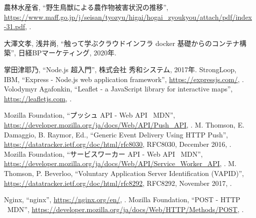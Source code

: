 \documentclass[12pt]{honka_v1}
\begin{document}
\fi
\begin{thebibliography}{99}
     農林水産省, ``野生鳥獣による農作物被害状況の推移'', \url{https://www.maff.go.jp/j/seisan/tyozyu/higai/hogai_zyoukyou/attach/pdf/index-31.pdf}, .
    
     大澤文孝, 浅井尚, ``触って学ぶクラウドインフラ docker 基礎からのコンテナ構築'', 日経BPマーケティング, 2020年.
    
     掌田津耶乃, ``Node.js 超入門'', 株式会社 秀和システム, 2017年.
     StrongLoop, IBM, ``Express - Node.js web application framework'', \url{https://expressjs.com/}, .
     Volodymyr Agafonkin, ``Leaflet - a JavaScript library for interactive maps'', \url{https://leafletjs.com}, .
    
     Mozilla Foundation, ``プッシュ API - Web API \textbar\ MDN'', \url{https://developer.mozilla.org/ja/docs/Web/API/Push_API}, .
     M. Thomson, E. Damaggio, B. Raymor, Ed., ``Generic Event Delivery Using HTTP Push'', \url{https://datatracker.ietf.org/doc/html/rfc8030}, RFC8030, December 2016, .
     Mozilla Foundation, ``サービスワーカー API - Web API \textbar\ MDN'', \url{https://developer.mozilla.org/ja/docs/Web/API/Service_Worker_API}, .
     M. Thomson, P. Beverloo, ``Voluntary Application Server Identification (VAPID)'', \url{https://datatracker.ietf.org/doc/html/rfc8292}, RFC8292, November 2017, .
    
     Nginx, ``nginx'', \url{https://nginx.org/en/}, .
     Mozilla Foundation, ``POST - HTTP \textbar\ MDN'', \url{https://developer.mozilla.org/ja/docs/Web/HTTP/Methods/POST}, .
    
    

\end{thebibliography}
\end{document}
